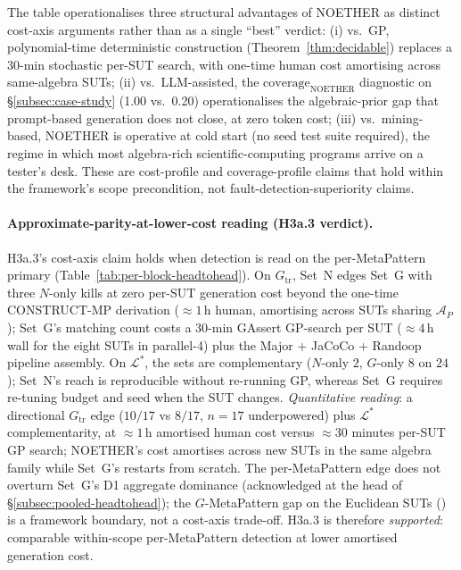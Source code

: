 \documentclass[acmsmall,screen,review]{acmart}
\begin{document}
The table operationalises three structural advantages of NOETHER as distinct cost-axis arguments rather than as a single ``best'' verdict: (i) vs.\ GP, polynomial-time deterministic construction (Theorem~\ref{thm:decidable}) replaces a 30-min stochastic per-SUT search, with one-time human cost amortising across same-algebra SUTs; (ii) vs.\ LLM-assisted, the $\mathrm{coverage}_{\mathrm{NOETHER}}$ diagnostic on \S\ref{subsec:case-study} (1.00 vs.\ 0.20) operationalises the algebraic-prior gap that prompt-based generation does not close, at zero token cost; (iii) vs.\ mining-based, NOETHER is operative at cold start (no seed test suite required), the regime in which most algebra-rich scientific-computing programs arrive on a tester's desk. These are cost-profile and coverage-profile claims that hold within the framework's scope precondition, not fault-detection-superiority claims.

\paragraph{Approximate-parity-at-lower-cost reading (H3a.3 verdict).}
\label{para:cost-axis-h3a}
H3a.3's cost-axis claim holds when detection is read on the per-MetaPattern primary (Table~\ref{tab:per-block-headtohead}). On $G_{\mathrm{tr}}$, Set~N edges Set~G with three $N$-only kills at zero per-SUT generation cost beyond the one-time CONSTRUCT-MP derivation ($\approx 1$\,h human, amortising across SUTs sharing $\mathcal{A}_P$); Set~G's matching count costs a 30-min GAssert GP-search per SUT ($\approx 4$\,h wall for the eight SUTs in parallel-4) plus the Major + JaCoCo + Randoop pipeline assembly. On $\mathcal{L}^{*}$, the sets are complementary ($N$-only $2$, $G$-only $8$ on $24$); Set~N's reach is reproducible without re-running GP, whereas Set~G requires re-tuning budget and seed when the SUT changes. \emph{Quantitative reading}: a directional $G_{\mathrm{tr}}$ edge ($10/17$ vs $8/17$, $n=17$ underpowered) plus $\mathcal{L}^{*}$ complementarity, at $\approx 1$\,h amortised human cost versus $\approx 30$ minutes per-SUT GP search; NOETHER's cost amortises across new SUTs in the same algebra family while Set~G's restarts from scratch. The per-MetaPattern edge does not overturn Set~G's D1 aggregate dominance (acknowledged at the head of \S\ref{subsec:pooled-headtohead}); the $G$-MetaPattern gap on the Euclidean SUTs () is a framework boundary, not a cost-axis trade-off. H3a.3 is therefore \emph{supported}: comparable within-scope per-MetaPattern detection at lower amortised generation cost.
\end{document}
